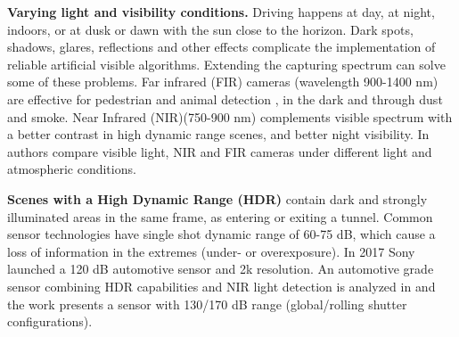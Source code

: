     \textbf{Varying light and visibility conditions.} Driving happens at day, 
    at night, indoors, or at dusk or dawn with the sun close to the horizon. 
    Dark spots, shadows, glares, reflections and other effects complicate the
    implementation of reliable artificial visible algorithms.
    Extending the capturing spectrum can solve some of these problems. 
    Far infrared (FIR) cameras (wavelength 900-1400 nm) 
    are effective for pedestrian and animal detection
    \cite{OMalley2008, Besbes2015}, in the dark and through dust and smoke.
    Near Infrared (NIR)(750-900 nm) complements visible spectrum with a better
    contrast in high dynamic range scenes, and better night visibility. 
    In \cite{Pinchon2018} authors compare visible light, NIR and FIR cameras 
    under different light and atmospheric conditions.
    
\textbf{Scenes with a High Dynamic Range (HDR)} contain dark and strongly
    illuminated areas in the same frame, as entering or exiting a tunnel.
    Common sensor technologies have single shot dynamic range of 60-75 dB,
    which cause a loss of information in the extremes (under- or overexposure).
    In 2017 Sony launched a 120 dB automotive sensor and 2k resolution.
    An automotive grade sensor combining HDR capabilities and NIR
    light detection is analyzed in \cite{Maddalena2005} and the work 
    \cite{Strobel2013} presents a sensor with 130/170 dB range (global/rolling 
    shutter configurations).
        

